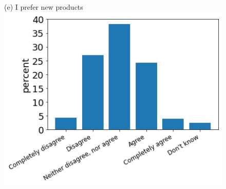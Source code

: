 \documentclass[12pt]{article}
\begin{document}
\begin{figure}[h!!]
\begin{minipage}[h!!]{0.32\textwidth}
\end{minipage}
	\begin{minipage}[h!!]{0.32\textwidth}  
	\centering\footnotesize{(e) I prefer new products}
	\includegraphics[width=1\textwidth]{../codding_data/results/liss/qk20a148title0.png}
\end{minipage}
\end{figure}
\end{document}
